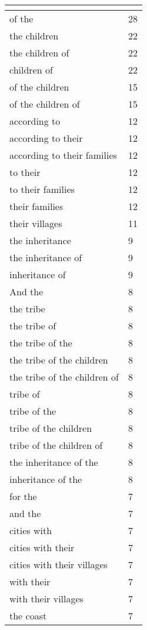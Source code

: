 \begin{center}
\begin{longtable}{|p{3.0in}|p{0.5in}|}
\hline \multicolumn{2}{c}{{ }} \\ \hline
\endfoot 
of the & 28\\ \hline 
the children & 22\\ \hline 
the children of & 22\\ \hline 
children of & 22\\ \hline 
of the children & 15\\ \hline 
of the children of & 15\\ \hline 
according to & 12\\ \hline 
according to their & 12\\ \hline 
according to their families & 12\\ \hline 
to their & 12\\ \hline 
to their families & 12\\ \hline 
their families & 12\\ \hline 
their villages & 11\\ \hline 
the inheritance & 9\\ \hline 
the inheritance of & 9\\ \hline 
inheritance of & 9\\ \hline 
And the & 8\\ \hline 
the tribe & 8\\ \hline 
the tribe of & 8\\ \hline 
the tribe of the & 8\\ \hline 
the tribe of the children & 8\\ \hline 
the tribe of the children of & 8\\ \hline 
tribe of & 8\\ \hline 
tribe of the & 8\\ \hline 
tribe of the children & 8\\ \hline 
tribe of the children of & 8\\ \hline 
the inheritance of the & 8\\ \hline 
inheritance of the & 8\\ \hline 
for the & 7\\ \hline 
and the & 7\\ \hline 
cities with & 7\\ \hline 
cities with their & 7\\ \hline 
cities with their villages & 7\\ \hline 
with their & 7\\ \hline 
with their villages & 7\\ \hline 
the coast & 7\\ \hline 

\end{longtable}
\end{center}
